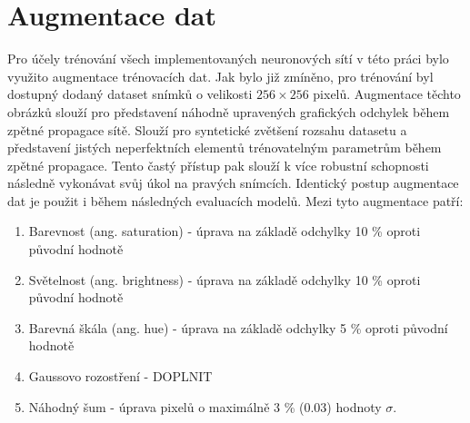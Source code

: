 \section{Augmentace dat}
\label{sec:Chapter41}
Pro účely trénování všech implementovaných neuronových sítí v této práci bylo využito augmentace trénovacích dat. Jak bylo již zmíněno, pro trénování byl dostupný dodaný dataset snímků o velikosti $256\times256$ pixelů. Augmentace těchto obrázků slouží pro představení náhodně upravených grafických odchylek během zpětné propagace sítě. Slouží pro syntetické zvětšení rozsahu datasetu a představení jistých neperfektních elementů trénovatelným parametrům během zpětné propagace. Tento častý přístup pak slouží k více robustní schopnosti následně vykonávat svůj úkol na pravých snímcích. Identický postup augmentace dat je použit i během následných evaluacích modelů. Mezi tyto augmentace patří:
\begin{enumerate}
  \item Barevnost (ang. saturation) - úprava na základě odchylky 10 \% oproti původní hodnotě
  \item Světelnost (ang. brightness) - úprava na základě odchylky 10 \% oproti původní hodnotě
  \item Barevná škála (ang. hue) - úprava na základě odchylky 5 \% oproti původní hodnotě
  \item Gaussovo rozostření - DOPLNIT
  \item Náhodný šum - úprava pixelů o maximálně 3 \% (0.03) hodnoty $\sigma$.
\end{enumerate}
\endinput